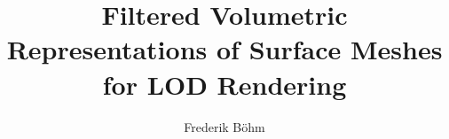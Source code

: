 \documentclass[11pt, twoside, openright, a4paper]{studdipl}
\title{Filtered Volumetric Representations of Surface Meshes for LOD Rendering}
\author{Frederik Böhm}
\begin{document}
\draft

\prepages

\maketitle

\cleardoublepage

\tableofcontents





\cleardoublepage

\mainbody


 

 










\begin{appendix}
	
\end{appendix}


\listoffigures


\printbibliography

\end{document}
